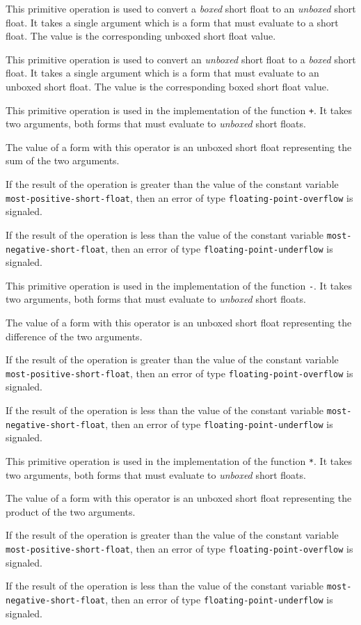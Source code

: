 
This primitive operation is used to convert a \emph{boxed} short float
to an \emph{unboxed} short float.  It takes a single argument which is
a form that must evaluate to a short float.  The value is the
corresponding unboxed short float value.


This primitive operation is used to convert an \emph{unboxed} short
float to a \emph{boxed} short float.  It takes a single argument which
is a form that must evaluate to an unboxed short float.  The value is
the corresponding boxed short float value.


This primitive operation is used in the implementation of the
\commonlisp{} function \texttt{+}.  It takes two arguments, both forms
that must evaluate to \emph{unboxed} short floats.

The value of a form with this operator is an unboxed short float
representing the sum of the two arguments.

If the result of the operation is greater than the value of the
constant variable \texttt{most-positive-short-float}, then an error of
type \texttt{floating-point-overflow} is signaled.

If the result of the operation is less than the value of the
constant variable \texttt{most-negative-short-float}, then an error of
type \texttt{floating-point-underflow} is signaled.


This primitive operation is used in the implementation of the
\commonlisp{} function \texttt{-}.  It takes two arguments, both forms
that must evaluate to \emph{unboxed} short floats.

The value of a form with this operator is an unboxed short float
representing the difference of the two arguments.

If the result of the operation is greater than the value of the
constant variable \texttt{most-positive-short-float}, then an error of
type \texttt{floating-point-overflow} is signaled.

If the result of the operation is less than the value of the
constant variable \texttt{most-negative-short-float}, then an error of
type \texttt{floating-point-underflow} is signaled.


This primitive operation is used in the implementation of the
\commonlisp{} function \texttt{*}.  It takes two arguments, both forms
that must evaluate to \emph{unboxed} short floats.

The value of a form with this operator is an unboxed short float
representing the product of the two arguments.

If the result of the operation is greater than the value of the
constant variable \texttt{most-positive-short-float}, then an error of
type \texttt{floating-point-overflow} is signaled.

If the result of the operation is less than the value of the constant
variable \texttt{most-negative-short-float}, then an error of type
\texttt{floating-point-underflow} is signaled.
